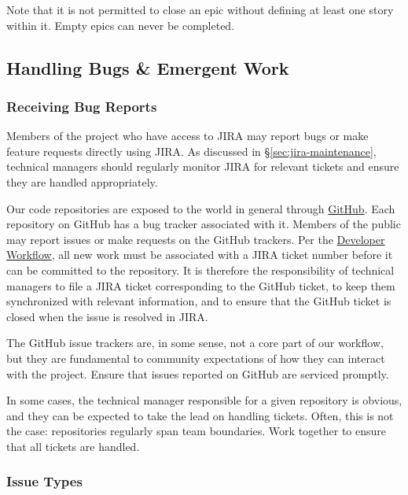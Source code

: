Note that it is not permitted to close an \gls{epic} without defining at least one \gls{story} within it.
Empty \glspl{epic} can never be completed.

\subsection{Handling Bugs \& Emergent Work}
\label{sec:bugs}

\subsubsection{Receiving Bug Reports}\label{receiving-bug-reports}

Members of the project who have access to \gls{JIRA} may report bugs or make feature requests directly using \gls{JIRA}.
As discussed in \S\ref{sec:jira-maintenance}, technical managers should regularly monitor \gls{JIRA} for relevant tickets and ensure they are handled appropriately.

Our code repositories are exposed to the world in general through \href{https://github.com/lsst/}{GitHub}.
Each repository on GitHub has a bug tracker associated with it.
Members of the public may report issues or make requests on the GitHub trackers.
Per the \href{https://developer.lsst.io/processes/workflow.html}{Developer Workflow}, all new work must be associated with a \gls{JIRA} ticket number before it can be committed to the repository.
It is therefore the responsibility of technical managers to file a \gls{JIRA} ticket corresponding to the GitHub ticket, to keep them synchronized with relevant information, and to ensure that the GitHub ticket is closed when the issue is resolved in \gls{JIRA}.

The GitHub issue trackers are, in some sense, not a core part of our
workflow, but they are fundamental to community expectations of how they
can interact with the project. Ensure that issues reported on GitHub are
serviced promptly.

In some cases, the technical manager responsible for a given repository
is obvious, and they can be expected to take the lead on handling
tickets. Often, this is not the case: repositories regularly span team
boundaries. Work together to ensure that all tickets are handled.

\subsubsection{Issue Types}\label{issue-types}


